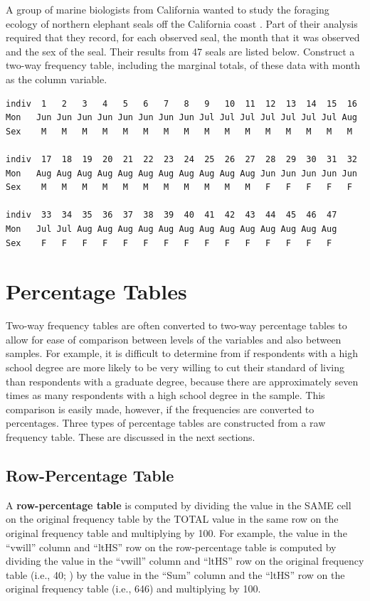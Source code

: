 \documentclass[10pt,openany]{book}\usepackage[]{graphicx}\usepackage[]{color}
\begin{document}
\vspace{-12pt}
\begin{exsection}
  \item \label{revex:cbEDASeal1} A group of marine biologists from California wanted to study the foraging ecology of northern elephant seals off the California coast \citep{LeBoeufetal2000}.  Part of their analysis required that they record, for each observed seal, the month that it was observed and the sex of the seal.  Their results from 47 seals are listed below.  Construct a two-way frequency table, including the marginal totals, of these data with month as the column variable. 
\begin{Verbatim}
indiv  1   2   3   4   5   6   7   8   9   10  11  12  13  14  15  16
Mon   Jun Jun Jun Jun Jun Jun Jun Jun Jul Jul Jul Jul Jul Jul Jul Aug
Sex    M   M   M   M   M   M   M   M   M   M   M   M   M   M   M   M

indiv  17  18  19  20  21  22  23  24  25  26  27  28  29  30  31  32
Mon   Aug Aug Aug Aug Aug Aug Aug Aug Aug Aug Aug Jun Jun Jun Jun Jun
Sex    M   M   M   M   M   M   M   M   M   M   M   F   F   F   F   F

indiv  33  34  35  36  37  38  39  40  41  42  43  44  45  46  47
Mon   Jul Jul Aug Aug Aug Aug Aug Aug Aug Aug Aug Aug Aug Aug Aug
Sex    F   F   F   F   F   F   F   F   F   F   F   F   F   F   F
\end{Verbatim}
\end{exsection}

\section{Percentage Tables}
Two-way frequency tables are often converted to two-way percentage tables to allow for ease of comparison between levels of the variables and also between samples.  For example, it is difficult to determine from  if respondents with a high school degree are more likely to be very willing to cut their standard of living than respondents with a graduate degree, because there are approximately seven times as many respondents with a high school degree in the sample.  This comparison is easily made, however, if the frequencies are converted to percentages.  Three types of percentage tables are constructed from a raw frequency table.  These are discussed in the next sections.

\subsection{Row-Percentage Table}
A \textbf{row-percentage table} is computed by dividing the value in the SAME cell on the original frequency table by the TOTAL value in the same row on the original frequency table and multiplying by 100.  For example, the value in the ``vwill'' column and ``ltHS'' row on the row-percentage table  is computed by dividing the value in the ``vwill'' column and ``ltHS'' row on the original frequency table (i.e., 40; ) by the value in the ``Sum'' column and the ``ltHS'' row on the original frequency table (i.e., 646) and multiplying by 100.
\end{document}
